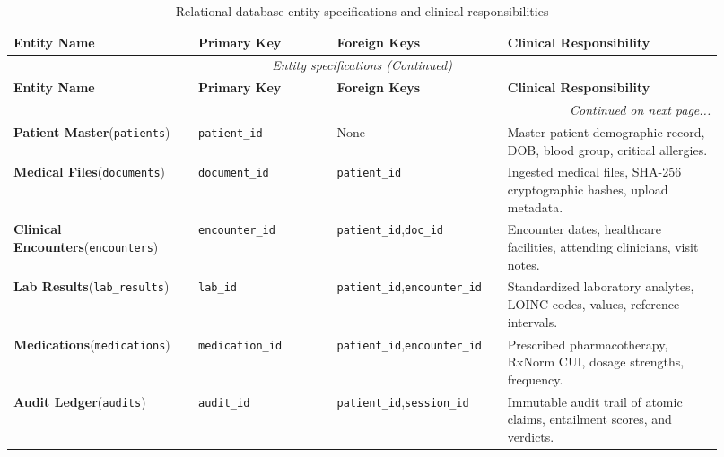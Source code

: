 \begin{longtable}{@{}p{0.24\linewidth} p{0.18\linewidth} p{0.22\linewidth} p{0.28\linewidth}@{}}
\caption{Relational database entity specifications and clinical responsibilities}\label{tab:4_1_entities} \\
\toprule
\textbf{Entity Name} & \textbf{Primary Key} & \textbf{Foreign Keys} & \textbf{Clinical Responsibility} \\
\midrule
\endfirsthead
\toprule
\multicolumn{4}{c}{\small\textit{Entity specifications (Continued)}} \\[4pt]
\midrule
\textbf{Entity Name} & \textbf{Primary Key} & \textbf{Foreign Keys} & \textbf{Clinical Responsibility} \\
\midrule
\endhead
\midrule
\multicolumn{4}{r}{\footnotesize\textit{Continued on next page...}} \\
\bottomrule
\endfoot
\bottomrule
\endlastfoot
\textbf{Patient Master}\newline(\texttt{patients}) & \texttt{patient\_id} & None & Master patient demographic record, DOB, blood group, critical allergies. \\
\midrule
\textbf{Medical Files}\newline(\texttt{documents}) & \texttt{document\_id} & \texttt{patient\_id} & Ingested medical files, SHA-256 cryptographic hashes, upload metadata. \\
\midrule
\textbf{Clinical Encounters}\newline(\texttt{encounters}) & \texttt{encounter\_id} & \texttt{patient\_id},\newline\texttt{doc\_id} & Encounter dates, healthcare facilities, attending clinicians, visit notes. \\
\midrule
\textbf{Lab Results}\newline(\texttt{lab\_results}) & \texttt{lab\_id} & \texttt{patient\_id},\newline\texttt{encounter\_id} & Standardized laboratory analytes, LOINC codes, values, reference intervals. \\
\midrule
\textbf{Medications}\newline(\texttt{medications}) & \texttt{medication\_id} & \texttt{patient\_id},\newline\texttt{encounter\_id} & Prescribed pharmacotherapy, RxNorm CUI, dosage strengths, frequency. \\
\midrule
\textbf{Audit Ledger}\newline(\texttt{audits}) & \texttt{audit\_id} & \texttt{patient\_id},\newline\texttt{session\_id} & Immutable audit trail of atomic claims, entailment scores, and verdicts. \\
\bottomrule
\end{longtable}
\normalsize


